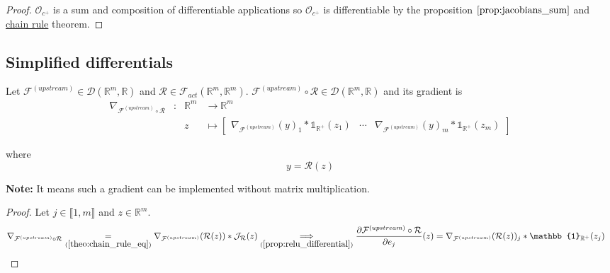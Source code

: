 \documentclass[11pt,en]{elegantpaper}
\newcommand{\Real}{\mathbb{R}}
\begin{document}
\begin{proof}
  $\mathcal{O}_{c^+}$ is a sum and composition of differentiable applications so $\mathcal{O}_{c^+}$ is differentiable by the proposition $\ref{prop:jacobians_sum}$ and \hyperref[theo:chain_rule]{chain rule} theorem. \par
\end{proof}

\subsection{Simplified differentials}

\begin{proposition}
  {\normalfont
    Let $\mathcal{F}^{(upstream)} \in \mathcal{D}(\Real^m,\Real)$ and
    $\mathcal{R} \in \mathcal{F}_{act}(\Real^m,\Real^m)$.
    $\mathcal{F}^{(upstream)} \circ \mathcal{R} \in \mathcal{D}(\Real^m,\Real)$ and its gradient is \begin{equation} \label{prop:relu_simplified_differential}
      \begin{array}{llll}
        \nabla_{\mathcal{F}^{(upstream)} \circ \mathcal{R}} & : & \Real^m  & \longrightarrow \Real^m \\
        &   & z & \longmapsto \begin{bmatrix}
          \nabla_{\mathcal{F}^{(upstream)}}(y)_1 * \mathbb{1}_{\Real^+}(z_1) & \cdots &
            \nabla_{\mathcal{F}^{(upstream)}}(y)_m * \mathbb{1}_{\Real^+}(z_m)
        \end{bmatrix}
      \end{array}
    \end{equation} \par
    where \begin{equation*}
      y = \mathcal{R}(z)
    \end{equation*}

    \textbf{Note:} It means such a gradient can be implemented without matrix multiplication.
  }
\end{proposition}

\begin{proof}
  Let $j \in \llbracket 1,m \rrbracket$ and $z \in \Real^m$.
  \begin{equation*}
    \begin{split}
      \nabla_{\mathcal{F}^{(upstream)} \circ \mathcal{R}} \underset{(\ref{theo:chain_rule_eq})}{=}
        \nabla_{\mathcal{F}^{(upstream)}}(\mathcal{R}(z)) * \mathcal{J}_{\mathcal{R}}(z) &
      \underset{(\ref{prop:relu_differential})}\implies \frac{\partial \mathcal{F}^{(upstream)} \circ \mathcal{R}}{\partial e_j}(z)
        = \nabla_{\mathcal{F}^{(upstream)}}(\mathcal{R}(z))_j * \mathbb{1}_{\Real^+}(z_j)
    \end{split}
  \end{equation*}
\end{proof}
\end{document}
